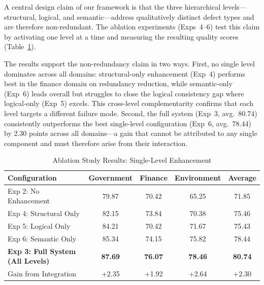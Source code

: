 \documentclass[runningheads]{llncs}
\begin{document}
A central design claim of our framework is that the three hierarchical levels—structural, logical, and semantic—address qualitatively distinct defect types and are therefore non-redundant. The ablation experiments (Exps~4--6) test this claim by activating one level at a time and measuring the resulting quality scores (Table~\ref{tab:ablation_single}).

The results support the non-redundancy claim in two ways. First, no single level dominates across all domains: structural-only enhancement (Exp~4) performs best in the finance domain on redundancy reduction, while semantic-only (Exp~6) leads overall but struggles to close the logical consistency gap where logical-only (Exp~5) excels. This cross-level complementarity confirms that each level targets a different failure mode. Second, the full system (Exp~3, avg.\ 80.74) consistently outperforms the best single-level configuration (Exp~6, avg.\ 78.44) by 2.30 points across all domains—a gain that cannot be attributed to any single component and must therefore arise from their interaction.

\begin{table}[H]
    \centering
    \caption{Ablation Study Results: Single-Level Enhancement}
    \label{tab:ablation_single}
    \begin{tabularx}{\textwidth}{l c c c c}
    \toprule
    Configuration & Government & Finance & Environment & Average \\
    \midrule
    Exp 2: No Enhancement & 79.87 & 70.42 & 65.25 & 71.85 \\
    \midrule
    Exp 4: Structural Only & 82.15 & 73.84 & 70.38 & 75.46 \\
    Exp 5: Logical Only & 84.21 & 70.42 & 71.67 & 75.43 \\
    Exp 6: Semantic Only & 85.34 & 74.15 & 75.82 & 78.44 \\
    \midrule
    \textbf{Exp 3: Full System (All Levels)} & \textbf{87.69} & \textbf{76.07} & \textbf{78.46} & \textbf{80.74} \\
    \midrule
    Gain from Integration & +2.35 & +1.92 & +2.64 & +2.30 \\
    \bottomrule
    \end{tabularx}
\end{table}
\end{document}
